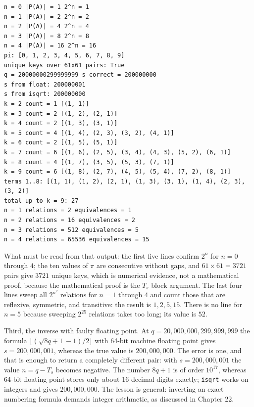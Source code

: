 \begin{verbatim}
n = 0 |P(A)| = 1 2^n = 1
n = 1 |P(A)| = 2 2^n = 2
n = 2 |P(A)| = 4 2^n = 4
n = 3 |P(A)| = 8 2^n = 8
n = 4 |P(A)| = 16 2^n = 16
pi: [0, 1, 2, 3, 4, 5, 6, 7, 8, 9]
unique keys over 61x61 pairs: True
q = 20000000299999999 s correct = 200000000
s from float: 200000001
s from isqrt: 200000000
k = 2 count = 1 [(1, 1)]
k = 3 count = 2 [(1, 2), (2, 1)]
k = 4 count = 2 [(1, 3), (3, 1)]
k = 5 count = 4 [(1, 4), (2, 3), (3, 2), (4, 1)]
k = 6 count = 2 [(1, 5), (5, 1)]
k = 7 count = 6 [(1, 6), (2, 5), (3, 4), (4, 3), (5, 2), (6, 1)]
k = 8 count = 4 [(1, 7), (3, 5), (5, 3), (7, 1)]
k = 9 count = 6 [(1, 8), (2, 7), (4, 5), (5, 4), (7, 2), (8, 1)]
terms 1..8: [(1, 1), (1, 2), (2, 1), (1, 3), (3, 1), (1, 4), (2, 3), (3, 2)]
total up to k = 9: 27
n = 1 relations = 2 equivalences = 1
n = 2 relations = 16 equivalences = 2
n = 3 relations = 512 equivalences = 5
n = 4 relations = 65536 equivalences = 15
\end{verbatim}

What must be read from that output: the first five lines confirm $2^{n}$ for
$n = 0$ through $4$; the ten values of $\pi$ are consecutive without gaps, and
$61 \times 61 = 3721$ pairs give $3721$ unique keys, which is numerical evidence, not a
mathematical proof, because the mathematical proof is the $T_s$ block argument. The
last four lines sweep all $2^{n^{2}}$ relations for $n = 1$ through $4$ and count those
that are reflexive, symmetric, and transitive: the result is $1, 2, 5, 15$. There is no
line for $n = 5$ because sweeping $2^{25}$ relations takes too long; its value is $52$.

Third, the inverse with faulty floating point. At $q = 20{,}000{,}000{,}299{,}999{,}999$ the
formula $\lfloor (\sqrt{8q+1}-1)/2 \rfloor$ with 64-bit machine floating point gives
$s = 200{,}000{,}001$, whereas the true value is $200{,}000{,}000$. The error is one, and that
is enough to return a completely different pair: with $s = 200{,}000{,}001$ the value
$n = q - T_s$ becomes negative. The number $8q+1$ is of order $10^{17}$, whereas
64-bit floating point stores only about $16$ decimal digits exactly; \texttt{isqrt}
works on integers and gives $200{,}000{,}000$. The lesson is general: inverting an exact
numbering formula demands integer arithmetic, as discussed in Chapter 22.

